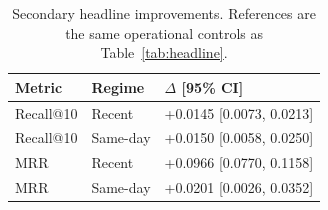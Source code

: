 \begin{table}[t]
\renewcommand{\arraystretch}{1.10}
\caption{Secondary headline improvements. References are the same operational controls as Table~\ref{tab:headline}.}\label{tab:secondary}
\centering\small
\begin{tabular*}{\linewidth}{@{\extracolsep{\fill}}lll@{}}\toprule
Metric & Regime & $\Delta$ [95\% CI]\\\midrule
Recall@10 & Recent & +0.0145 [0.0073, 0.0213]\\
Recall@10 & Same-day & +0.0150 [0.0058, 0.0250]\\
MRR & Recent & +0.0966 [0.0770, 0.1158]\\
MRR & Same-day & +0.0201 [0.0026, 0.0352]\\\bottomrule
\end{tabular*}\end{table}
